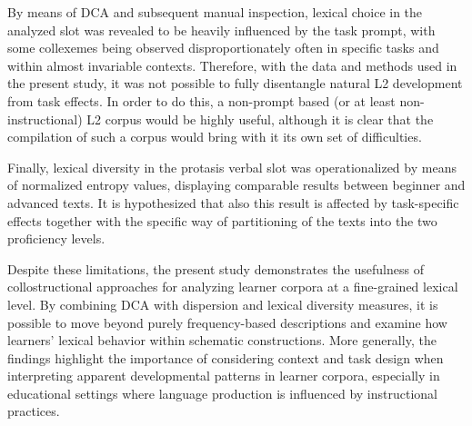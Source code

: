 By means of DCA and subsequent manual inspection, lexical choice in the analyzed slot was revealed to be heavily influenced by the task prompt, with some collexemes being observed disproportionately often in specific tasks and within almost invariable contexts. 
Therefore, with the data and methods used in the present study, it was not possible to fully disentangle natural L2 development from task effects. 
In order to do this, a non-prompt based (or at least non-instructional) L2 corpus would be highly useful, although it is clear that the compilation of such a corpus would bring with it its own set of difficulties.

Finally, lexical diversity in the protasis verbal slot was operationalized by means of normalized entropy values, displaying comparable results between beginner and advanced texts.
It is hypothesized that also this result is affected by task-specific effects together with the specific way of partitioning of the texts into the two proficiency levels. 

Despite these limitations, the present study demonstrates the usefulness of collostructional approaches for analyzing learner corpora at a fine-grained lexical level.
By combining DCA with dispersion and lexical diversity measures, it is possible to move beyond purely frequency-based descriptions and examine how learners' lexical behavior within schematic constructions.
More generally, the findings highlight the importance of considering context and task design when interpreting apparent developmental patterns in learner corpora, especially in educational settings where language production is influenced by instructional practices.
